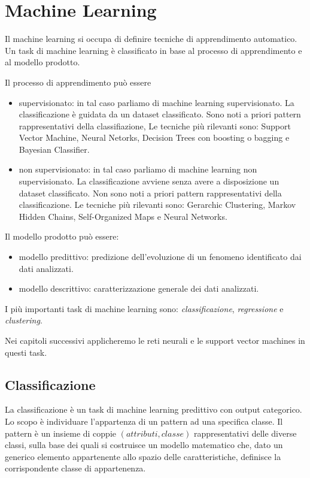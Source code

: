 \chapter{Machine Learning}
\label{chp:machine-learning}
Il machine learning si occupa di definire tecniche di apprendimento automatico.
Un task di machine learning è classificato in base al processo di apprendimento e al modello prodotto.

Il processo di apprendimento può essere
\begin{itemize}
  \item supervisionato: in tal caso parliamo di machine learning supervisionato. La classificazione è guidata da un dataset classificato. Sono noti a priori pattern rappresentativi della classifiazione, Le tecniche più rilevanti sono: Support Vector Machine, Neural Netorks, Decision Trees con boosting o bagging e Bayesian Classifier.

  \item non supervisionato: in tal caso parliamo di machine learning non supervisionato. La classificazione avviene senza avere a disposizione un dataset classificato. Non sono noti a priori pattern rappresentativi della classificazione. Le tecniche più rilevanti sono: Gerarchic Clustering, Markov Hidden Chains, Self-Organized Maps e Neural Networks.
\end{itemize}

Il modello prodotto può essere:
\begin{itemize}
  \item modello predittivo: predizione dell'evoluzione di un fenomeno identificato dai dati analizzati.
  \item modello descrittivo: caratterizzazione generale dei dati analizzati.
\end{itemize}

I più importanti task di machine learning sono: \textit{classificazione}, \textit{regressione} e \textit{clustering}.

Nei capitoli successivi applicheremo le reti neurali e le support vector machines in questi task.


\section{Classificazione}
\label{sec:machine-learning.classification}
La classificazione è un task di machine learning predittivo con output categorico. Lo scopo è individuare l'appartenza di un pattern ad una specifica classe. Il pattern è un insieme di coppie $(attributi,classe)$ rappresentativi delle diverse classi, sulla base dei quali si costruisce un modello matematico che, dato un generico elemento appartenente allo spazio delle caratteristiche, definisce la corrispondente classe di appartenenza.

